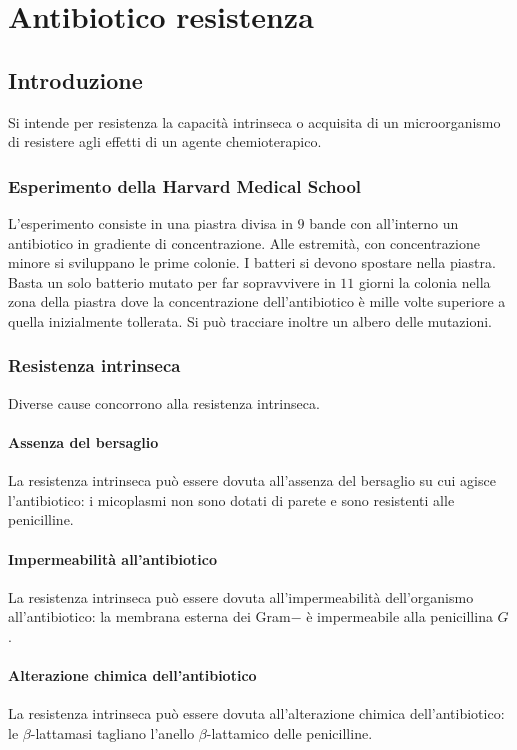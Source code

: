 \chapter{Antibiotico resistenza}

\section{Introduzione}
Si intende per resistenza la capacit\`a intrinseca o acquisita di un microorganismo di resistere agli effetti di un agente chemioterapico.


	\subsection{Esperimento della Harvard Medical School}
	L'esperimento consiste in una piastra divisa in $9$ bande con all'interno un antibiotico in gradiente di concentrazione.
	Alle estremit\`a, con concentrazione minore si sviluppano le prime colonie.
	I batteri si devono spostare nella piastra.
	Basta un solo batterio mutato per far sopravvivere in $11$ giorni la colonia nella zona della piastra dove la concentrazione dell'antibiotico \`e mille volte superiore a quella inizialmente tollerata.
	Si pu\`o tracciare inoltre un albero delle mutazioni.



	\subsection{Resistenza intrinseca}
	Diverse cause concorrono alla resistenza intrinseca.

		\subsubsection{Assenza del bersaglio}
		La resistenza intrinseca pu\`o essere dovuta all'assenza del bersaglio su cui agisce l'antibiotico: i micoplasmi non sono dotati di parete e sono resistenti alle penicilline.

		\subsubsection{Impermeabilit\`a all'antibiotico}
		La resistenza intrinseca pu\`o essere dovuta all'impermeabilit\`a dell'organismo all'antibiotico: la membrana esterna dei Gram$-$ \`e impermeabile alla penicillina $G$.

		\subsubsection{Alterazione chimica dell'antibiotico}
		La resistenza intrinseca pu\`o essere dovuta all'alterazione chimica dell'antibiotico: le $\beta$-lattamasi tagliano l'anello $\beta$-lattamico delle penicilline.


